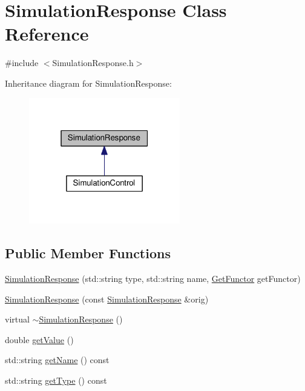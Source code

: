 \hypertarget{class_simulation_response}{}\section{Simulation\+Response Class Reference}
\label{class_simulation_response}


{\ttfamily \#include $<$Simulation\+Response.\+h$>$}



Inheritance diagram for Simulation\+Response\+:
\nopagebreak
\begin{figure}[H]
\begin{center}
\leavevmode
\includegraphics[width=187pt]{class_simulation_response__inherit__graph}
\end{center}
\end{figure}
\subsection*{Public Member Functions}
\begin{DoxyCompactItemize}
\item 
\hyperlink{class_simulation_response_a04cf14f90cd74a234491c653c772834e}{Simulation\+Response} (std\+::string type, std\+::string name, \hyperlink{_functor_8h_a69893c7d35bc5c3bdb40b1034fe4838e}{Get\+Functor} get\+Functor)
\item 
\hyperlink{class_simulation_response_aaa3a1bdb3a9a330eea2264fdeaa2bdb2}{Simulation\+Response} (const \hyperlink{class_simulation_response}{Simulation\+Response} \&orig)
\item 
virtual \hyperlink{class_simulation_response_acca988782297cd916b8a8532368fc94d}{$\sim$\+Simulation\+Response} ()
\item 
double \hyperlink{class_simulation_response_a192c1e10f0ecd3e6f6a06990bc73c07a}{get\+Value} ()
\item 
std\+::string \hyperlink{class_simulation_response_a2f1db747e9dfd4d641d761b6cf23af9b}{get\+Name} () const 
\item 
std\+::string \hyperlink{class_simulation_response_a3fd37c35a74ec17b651eea2e145ecf4f}{get\+Type} () const 
\end{DoxyCompactItemize}
